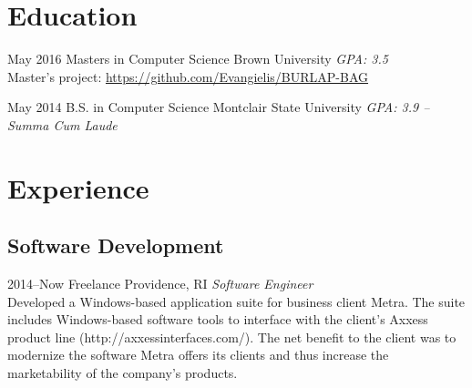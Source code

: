 \documentclass[]{friggeri-cv} %
\begin{document}
\section{Education}

\begin{entrylist}


\entry
{May 2016}
{Masters {\normalfont in Computer Science}}
{Brown University}
{\emph{GPA: 3.5} \\ Master's project: \href{https://github.com/Evangielis/BURLAP-BAG}{https://github.com/Evangielis/BURLAP-BAG}}


\entry
{May 2014}
{B.S. {\normalfont in Computer Science}}
{Montclair State University}
{\emph{GPA: 3.9 -- Summa Cum Laude}}


\end{entrylist}


\section{Experience}

\subsection{Software Development}

\begin{entrylist}


\entry
{2014--Now}
{Freelance}
{Providence, RI}
{\emph{Software Engineer} \\
Developed a Windows-based application suite for business client Metra.  The suite includes Windows-based software tools to interface with the client's Axxess product line (http://axxessinterfaces.com/).  The net benefit to the client was to modernize the software Metra offers its clients and thus increase the marketability of the company's products. }


\end{entrylist}
\end{document}
